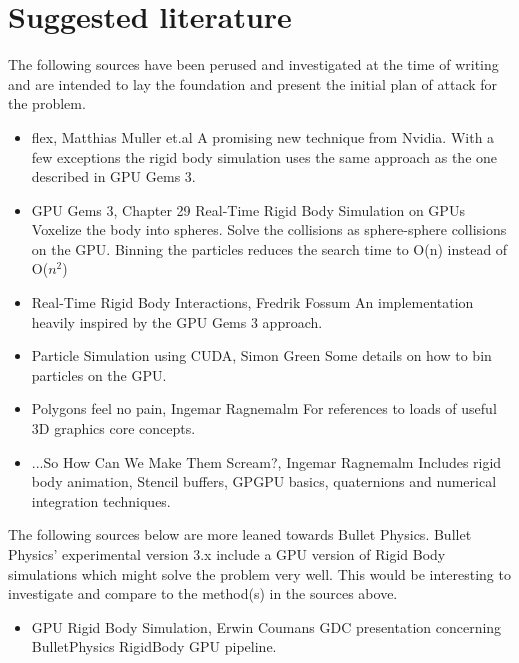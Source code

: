 \chapter{Suggested literature}\label{cha:lit}
The following sources have been perused and investigated at the time of writing
and are intended to lay the foundation and present the initial plan of attack for
the problem.

\begin{itemize}

  \item flex, Matthias Muller et.al \newline
  A promising new technique from Nvidia. With a few exceptions the rigid body
  simulation uses the same approach as the one described in GPU Gems 3.

  \item GPU Gems 3, Chapter 29 Real-Time Rigid Body Simulation on GPUs \newline
  Voxelize the body into spheres. Solve the collisions as sphere-sphere collisions
  on the GPU. Binning the particles reduces the search time to O(n) instead of O($n^2$)

  \item Real-Time Rigid Body Interactions, Fredrik Fossum \newline
  An implementation heavily inspired by the GPU Gems 3 approach.

  \item Particle Simulation using CUDA, Simon Green \newline
  Some details on how to bin particles on the GPU.

  \item Polygons feel no pain, Ingemar Ragnemalm \newline
  For references to loads of useful 3D graphics core concepts.

  \item ...So How Can We Make Them Scream?, Ingemar Ragnemalm \newline
  Includes rigid body animation, Stencil buffers, GPGPU basics, quaternions and
  numerical integration techniques.

\end{itemize}

The following sources below are more leaned towards Bullet Physics. Bullet Physics'
experimental version 3.x include a GPU version of Rigid Body simulations which
might solve the problem very well. This would be interesting to investigate and
compare to the method(s) in the sources above.

\begin{itemize}

  \item GPU Rigid Body Simulation, Erwin Coumans \newline
  GDC presentation concerning BulletPhysics RigidBody GPU pipeline.

\end{itemize}

